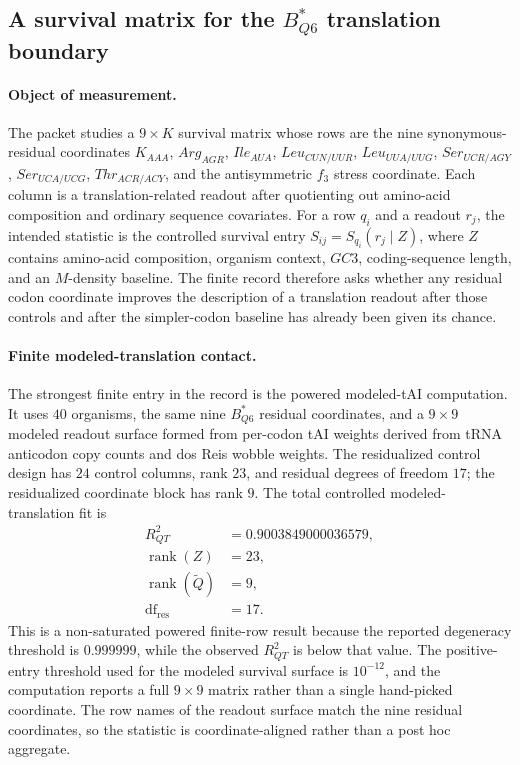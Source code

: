 \subsection{A survival matrix for the $B^{\ast}_{Q6}$ translation boundary}
\label{sec:bioreality-translation-survival-b-star-q6-survival-matrix}

\paragraph{Object of measurement.}
The packet studies a $9\times K$ survival matrix whose rows are the nine synonymous-residual coordinates
$K_{AAA}$, $Arg_{AGR}$, $Ile_{AUA}$, $Leu_{CUN/UUR}$, $Leu_{UUA/UUG}$, $Ser_{UCR/AGY}$, $Ser_{UCA/UCG}$, $Thr_{ACR/ACY}$, and the antisymmetric $f_3$ stress coordinate.  Each column is a translation-related readout after quotienting out amino-acid composition and ordinary sequence covariates.  For a row $q_i$ and a readout $r_j$, the intended statistic is the controlled survival entry $S_{ij}=S_{q_i}(r_j\mid Z)$, where $Z$ contains amino-acid composition, organism context, $GC3$, coding-sequence length, and an $M$-density baseline.  The finite record therefore asks whether any residual codon coordinate improves the description of a translation readout after those controls and after the simpler-codon baseline has already been given its chance.

\paragraph{Finite modeled-translation contact.}
The strongest finite entry in the record is the powered modeled-tAI computation.  It uses $40$ organisms, the same nine $B^{\ast}_{Q6}$ residual coordinates, and a $9\times 9$ modeled readout surface formed from per-codon tAI weights derived from tRNA anticodon copy counts and dos Reis wobble weights.  The residualized control design has $24$ control columns, rank $23$, and residual degrees of freedom $17$; the residualized coordinate block has rank $9$.  The total controlled modeled-translation fit is
$$
\begin{aligned}
R^2_{QT} &= 0.9003849000036579,\\
\operatorname{rank}(Z) &= 23,\\
\operatorname{rank}(\widetilde Q) &= 9,\\
\operatorname{df}_{\mathrm{res}} &= 17.
\end{aligned}
$$
This is a non-saturated powered finite-row result because the reported degeneracy threshold is $0.999999$, while the observed $R^2_{QT}$ is below that value.  The positive-entry threshold used for the modeled survival surface is $10^{-12}$, and the computation reports a full $9\times 9$ matrix rather than a single hand-picked coordinate.  The row names of the readout surface match the nine residual coordinates, so the statistic is coordinate-aligned rather than a post hoc aggregate.

